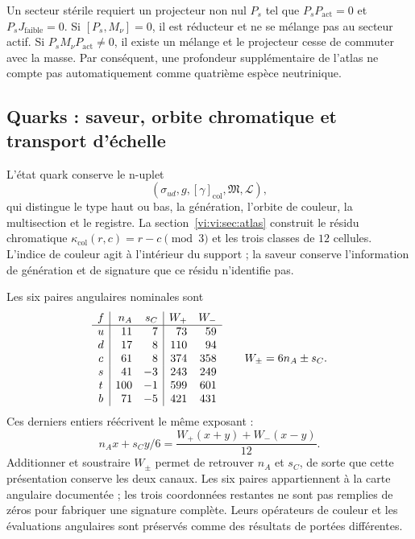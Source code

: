 Un secteur stérile requiert un projecteur non nul \(P_s\) tel que
\(P_sP_{\mathrm{act}}=0\) et \(P_sJ_{\text{faible}}=0\).
Si \([P_s,M_\nu]=0\), il est réducteur et ne se mélange pas au secteur actif.
Si \(P_sM_\nu P_{\mathrm{act}}\ne0\), il existe un mélange et le projecteur
cesse de commuter avec la masse. Par conséquent, une profondeur supplémentaire de
l’atlas ne compte pas automatiquement comme quatrième espèce neutrinique.

\subsection{Quarks : saveur, orbite chromatique et transport d’échelle}
\label{vi:vi:subsec:quarks-familias}

L’état quark conserve le n-uplet
\[
 (\sigma_{ud},g,[\gamma]_{\mathrm{col}},\mathfrak M,\mathscr L),
\]
qui distingue le type haut ou bas, la génération, l’orbite de couleur,
la multisection et le registre. La section~\ref{vi:vi:sec:atlas} construit le
résidu chromatique \(\kappa_{\mathrm{col}}(r,c)=r-c\pmod3\) et les
trois classes de \(12\) cellules. L’indice de couleur agit à l’intérieur du
support ; la saveur conserve l’information de génération et de signature que ce
résidu n’identifie pas.

Les six paires angulaires nominales sont
\[
\begin{array}{c|r r|r r}
 f&n_A&s_C&W_+&W_-\\\hline
 u&11&7&73&59\\
 d&17&8&110&94\\
 c&61&8&374&358\\
 s&41&-3&243&249\\
 t&100&-1&599&601\\
 b&71&-5&421&431
\end{array}
\qquad W_\pm=6n_A\pm s_C.
\]
Ces derniers entiers réécrivent le même exposant :
\[
 n_Ax+s_Cy/6
 =\frac{W_+(x+y)+W_-(x-y)}{12}.
\]
Additionner et soustraire \(W_\pm\) permet de retrouver \(n_A\) et \(s_C\), de sorte que
cette présentation conserve les deux canaux. Les six paires appartiennent
à la carte angulaire documentée ; les trois coordonnées restantes
ne sont pas remplies de zéros pour fabriquer une signature complète. Leurs opérateurs
de couleur et les évaluations angulaires sont préservés comme des résultats de
portées différentes.

